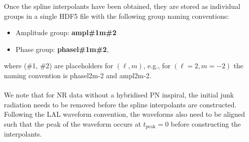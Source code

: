 \documentclass[aps,prd,amssymb,amsmath,amsfonts,superscriptaddress,
floatfix ,preprintnumbers,altaffilletter]{revtex4}
\begin{document}
Once the spline interpolants have been obtained, they are stored as individual groups in a single HDF5 file with the following group naming
conventions: 
\begin{itemize}
  \item Amplitude group: \textbf{amp\textunderscore l\#1\textunderscore m\#2}
  \item Phase group: \textbf{phase\textunderscore  l\#1\textunderscore m\#2},
\end{itemize}
where (\#1, \#2) are placeholders for $(\ell, m)$, e.g., for $(\ell=2, m=-2)$ the naming convention is phase\textunderscore l2\textunderscore m-2 and 
amp\textunderscore l2\textunderscore m-2. \\
\\We note that for NR data without a hybridised PN inspiral, the initial junk radiation needs to be removed before the spline interpolants are constructed. 
Following the LAL waveform convention, the waveforms also need to be aligned such that the peak of the waveform occurs at $t_\mathrm{peak}=0$ 
before constructing the interpolants.

\end{document}
